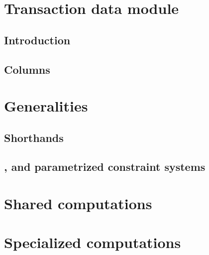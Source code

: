 
\section{Transaction data module}                                           \label{user txn data: generalities}
\subsection{Introduction}                                                   \label{user txn data: intro}                                       
\subsection{Columns}                                                        \label{user txn data: columns}                                     

\section{Generalities}                                                      \label{user txn data: generalities}                                
\subsection{Shorthands}                                                     \label{user txn data: constraints: shorthands}                     
\subsection{\wcpFlag{}, \eucFlag{} and parametrized constraint systems}     \label{user txn data: constraints: comparison constraints}         
\section{Shared computations}                                               \label{user txn data: constraints: common computations}            
\section{Specialized computations}                                          \label{user txn data: constraints: specialized computations}       
